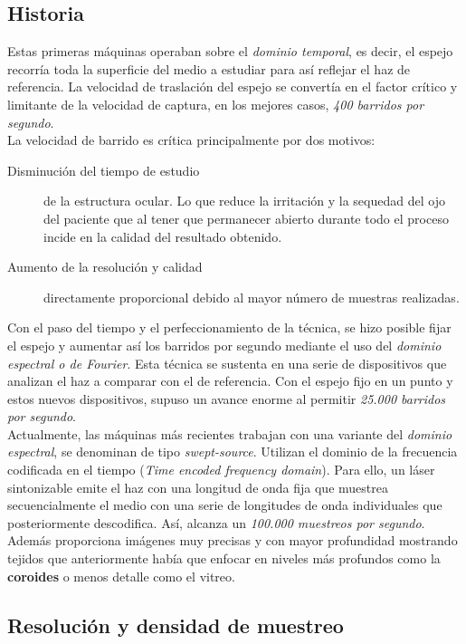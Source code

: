\subsection{Historia}
Estas primeras máquinas operaban sobre el \emph{dominio temporal}, es decir,
el espejo recorría toda la superficie del medio a estudiar para así
reflejar el haz de referencia. La velocidad de traslación del espejo
se convertía en el factor crítico y limitante de la velocidad de
captura, en los mejores casos, \emph{400 barridos por segundo}.\\
La velocidad de barrido es crítica principalmente por dos motivos:
\begin{description}
\item [Disminución del tiempo de estudio] de la estructura ocular. Lo
  que reduce la irritación y la sequedad del ojo del paciente que al
  tener que permanecer abierto durante todo el proceso incide en la
  calidad del resultado obtenido.
\item [Aumento de la resolución y calidad] directamente proporcional
  debido al mayor número de muestras realizadas.
\end{description}
Con el paso del tiempo y el perfeccionamiento de la técnica, se hizo
posible fijar el espejo y aumentar así los barridos por segundo
mediante el uso del \emph{dominio espectral o de Fourier}. Esta
técnica se sustenta en una serie de dispositivos que analizan el haz a
comparar con el de referencia. Con el espejo fijo en un punto y estos
nuevos dispositivos, supuso un avance enorme al permitir \emph{25.000
  barridos por segundo}.\\
Actualmente, las máquinas más recientes trabajan con una variante del
\emph{dominio espectral}, se denominan de tipo
\emph{swept-source}. Utilizan el dominio de la frecuencia codificada
en el tiempo (\emph{Time encoded frequency domain}). Para ello, un
láser sintonizable emite el haz con una longitud de onda fija que
muestrea secuencialmente el medio con una serie de longitudes de onda
individuales que posteriormente descodifica. Así, alcanza un
\emph{100.000 muestreos por segundo}. Además proporciona imágenes muy
precisas y con mayor profundidad mostrando tejidos que anteriormente
había que enfocar en niveles más profundos como la \textbf{coroides} o
menos detalle como el vitreo.

\subsection{Resolución y densidad de muestreo}




